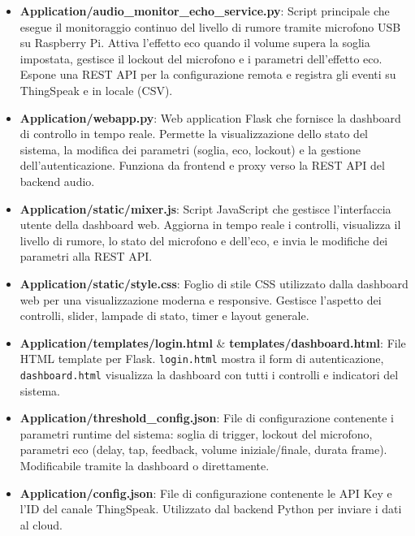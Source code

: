 \documentclass[fleqn,10pt]{SelfArx} %
\begin{document}
\begin{itemize}
	\item \textbf{Application/audio\_monitor\_echo\_service.py}:  
	Script principale che esegue il monitoraggio continuo del livello di rumore tramite microfono USB su Raspberry Pi. Attiva l'effetto eco quando il volume supera la soglia impostata, gestisce il lockout del microfono e i parametri dell'effetto eco. Espone una REST API per la configurazione remota e registra gli eventi su ThingSpeak e in locale (CSV).
	
	\item \textbf{Application/webapp.py}:  
	Web application Flask che fornisce la dashboard di controllo in tempo reale. Permette la visualizzazione dello stato del sistema, la modifica dei parametri (soglia, eco, lockout) e la gestione dell'autenticazione. Funziona da frontend e proxy verso la REST API del backend audio.
	
	\item \textbf{Application/static/mixer.js}:  
	Script JavaScript che gestisce l'interfaccia utente della dashboard web. Aggiorna in tempo reale i controlli, visualizza il livello di rumore, lo stato del microfono e dell'eco, e invia le modifiche dei parametri alla REST API.
	
	\item \textbf{Application/static/style.css}:  
	Foglio di stile CSS utilizzato dalla dashboard web per una visualizzazione moderna e responsive. Gestisce l'aspetto dei controlli, slider, lampade di stato, timer e layout generale.
	
	\item \textbf{Application/templates/login.html} \& \textbf{templates/dashboard.html}:  
	File HTML template per Flask. \texttt{login.html} mostra il form di autenticazione, \texttt{dashboard.html} visualizza la dashboard con tutti i controlli e indicatori del sistema.
	
	\item \textbf{Application/threshold\_config.json}:  
	File di configurazione contenente i parametri runtime del sistema: soglia di trigger, lockout del microfono, parametri eco (delay, tap, feedback, volume iniziale/finale, durata frame). Modificabile tramite la dashboard o direttamente.
	
	\item \textbf{Application/config.json}: %
	File di configurazione contenente le API Key e l'ID del canale ThingSpeak. Utilizzato dal backend Python per inviare i dati al cloud.
	

\end{itemize}
\end{document}
